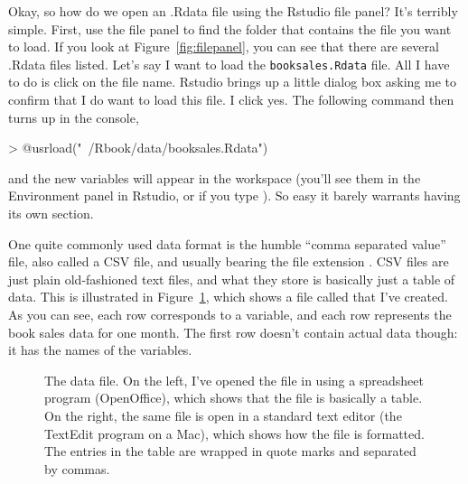 
Okay, so how do we open an .Rdata file using the Rstudio file panel? It's terribly simple. First, use the file panel to find the folder that contains the file you want to load. If you look at Figure~\ref{fig:filepanel}, you can see that there are several .Rdata files listed. Let's say I want to load the \texttt{booksales.Rdata} file. All I have to do is click on the file name. Rstudio brings up a little dialog box asking me to confirm that I do want to load this file. I click yes. The following command then turns up in the console,
\begin{rblock1}
> @usr{load("~/Rbook/data/booksales.Rdata")}
\end{rblock1}
and the new variables will appear in the workspace (you'll see them in the Environment panel in Rstudio, or if you type ). So easy it barely warrants having its own section.



One quite commonly used data format is the humble ``comma separated value'' file, also called a CSV file, and usually bearing the file extension . CSV files are just plain old-fashioned text files, and what they store is basically just a table of data. This is illustrated in Figure~\ref{fig:booksalescsv}, which shows a file called  that I've created. As you can see, each row corresponds to a variable, and each row represents the book sales data for one month. The first row doesn't contain actual data though: it has the names of the variables.

\begin{figure}
\begin{center}
\caption{The  data file. On the left, I've opened the file in using a spreadsheet program (OpenOffice), which shows that the file is basically a table. On the right, the same file is open in a standard text editor (the TextEdit program on a Mac), which shows how the file is formatted. The entries in the table are wrapped in quote marks and separated by commas.}
\HR
\label{fig:booksalescsv}
\end{center}
\end{figure} 

